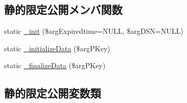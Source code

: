 \subsection*{静的限定公開メンバ関数}
\begin{DoxyCompactItemize}
\item 
static \hyperlink{class_session_data_memcache_a1022edb4a06d9ccdad6defe968138284}{\+\_\+init} (\$arg\+Expiredtime=N\+U\+L\+L, \$arg\+D\+S\+N=N\+U\+L\+L)
\item 
static \hyperlink{class_session_data_memcache_a453fa5b1a8e999377b726dc7bce92ee6}{\+\_\+initialize\+Data} (\$arg\+P\+Key)
\item 
static \hyperlink{class_session_data_memcache_a39978a1adfb67fe1add5053cabfce074}{\+\_\+finalize\+Data} (\$arg\+P\+Key)
\end{DoxyCompactItemize}
\subsection*{静的限定公開変数類}
